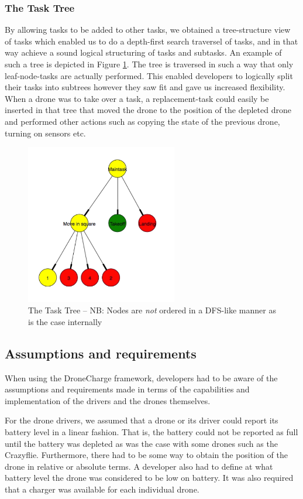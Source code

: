 \subsubsection{The Task Tree}
By allowing tasks to be added to other tasks, we obtained a tree-structure view of tasks which enabled us to do a depth-first search traversel of tasks, and in that way achieve a sound logical structuring of tasks and subtasks. An example of such a tree is depicted in Figure \ref{fig:tasktree}. The tree is traversed in such a way that only leaf-node-tasks are actually performed. This enabled developers to logically split their tasks into subtrees however they saw fit and gave us increased flexibility. When a drone was to take over a task, a replacement-task could easily be inserted in that tree that moved the drone to the position of the depleted drone and performed other actions such as copying the state of the previous drone, turning on sensors etc.

\begin{figure}[h]
\begin{center}
\includegraphics[height=7cm]{images/task-graph.png}%
\caption{The Task Tree -- NB: Nodes are \textit{not} ordered in a DFS-like manner as is the case internally}
\label{fig:tasktree}
\end{center}
\end{figure}

\subsection{Assumptions and requirements}
When using the DroneCharge framework, developers had to be aware of the assumptions and requirements made in terms of the capabilities and implementation of the drivers and the drones themselves.

For the drone drivers, we assumed that a drone or its driver could report its battery level in a linear fashion. That is, the battery could not be reported as full until the battery was depleted as was the case with some drones such as the Crazyflie. Furthermore, there had to be some way to obtain the position of the drone in relative or absolute terms. A developer also had to define at what battery level the drone was considered to be low on battery. It was also required that a charger was available for each individual drone.

